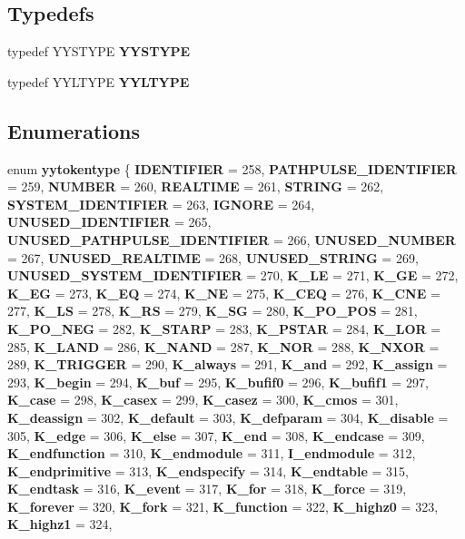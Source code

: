 \subsection*{Typedefs}
\begin{CompactItemize}
\item 
typedef YYSTYPE {\bf YYSTYPE}
\item 
typedef YYLTYPE {\bf YYLTYPE}
\end{CompactItemize}
\subsection*{Enumerations}
\begin{CompactItemize}
\item 
enum {\bf yytokentype} \{ {\bf IDENTIFIER} =  258, 
{\bf PATHPULSE\_\-IDENTIFIER} =  259, 
{\bf NUMBER} =  260, 
{\bf REALTIME} =  261, 
{\bf STRING} =  262, 
{\bf SYSTEM\_\-IDENTIFIER} =  263, 
{\bf IGNORE} =  264, 
{\bf UNUSED\_\-IDENTIFIER} =  265, 
{\bf UNUSED\_\-PATHPULSE\_\-IDENTIFIER} =  266, 
{\bf UNUSED\_\-NUMBER} =  267, 
{\bf UNUSED\_\-REALTIME} =  268, 
{\bf UNUSED\_\-STRING} =  269, 
{\bf UNUSED\_\-SYSTEM\_\-IDENTIFIER} =  270, 
{\bf K\_\-LE} =  271, 
{\bf K\_\-GE} =  272, 
{\bf K\_\-EG} =  273, 
{\bf K\_\-EQ} =  274, 
{\bf K\_\-NE} =  275, 
{\bf K\_\-CEQ} =  276, 
{\bf K\_\-CNE} =  277, 
{\bf K\_\-LS} =  278, 
{\bf K\_\-RS} =  279, 
{\bf K\_\-SG} =  280, 
{\bf K\_\-PO\_\-POS} =  281, 
{\bf K\_\-PO\_\-NEG} =  282, 
{\bf K\_\-STARP} =  283, 
{\bf K\_\-PSTAR} =  284, 
{\bf K\_\-LOR} =  285, 
{\bf K\_\-LAND} =  286, 
{\bf K\_\-NAND} =  287, 
{\bf K\_\-NOR} =  288, 
{\bf K\_\-NXOR} =  289, 
{\bf K\_\-TRIGGER} =  290, 
{\bf K\_\-always} =  291, 
{\bf K\_\-and} =  292, 
{\bf K\_\-assign} =  293, 
{\bf K\_\-begin} =  294, 
{\bf K\_\-buf} =  295, 
{\bf K\_\-bufif0} =  296, 
{\bf K\_\-bufif1} =  297, 
{\bf K\_\-case} =  298, 
{\bf K\_\-casex} =  299, 
{\bf K\_\-casez} =  300, 
{\bf K\_\-cmos} =  301, 
{\bf K\_\-deassign} =  302, 
{\bf K\_\-default} =  303, 
{\bf K\_\-defparam} =  304, 
{\bf K\_\-disable} =  305, 
{\bf K\_\-edge} =  306, 
{\bf K\_\-else} =  307, 
{\bf K\_\-end} =  308, 
{\bf K\_\-endcase} =  309, 
{\bf K\_\-endfunction} =  310, 
{\bf K\_\-endmodule} =  311, 
{\bf I\_\-endmodule} =  312, 
{\bf K\_\-endprimitive} =  313, 
{\bf K\_\-endspecify} =  314, 
{\bf K\_\-endtable} =  315, 
{\bf K\_\-endtask} =  316, 
{\bf K\_\-event} =  317, 
{\bf K\_\-for} =  318, 
{\bf K\_\-force} =  319, 
{\bf K\_\-forever} =  320, 
{\bf K\_\-fork} =  321, 
{\bf K\_\-function} =  322, 
{\bf K\_\-highz0} =  323, 
{\bf K\_\-highz1} =  324, 

\end{CompactItemize}
